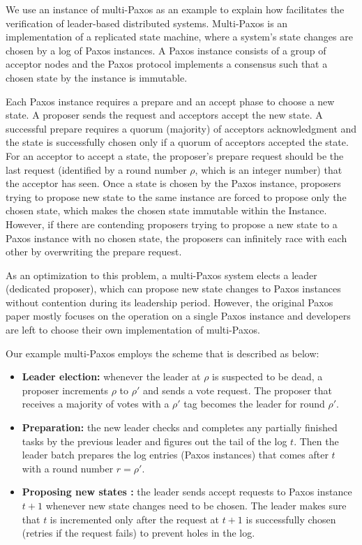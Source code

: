 We use an instance of multi-Paxos as an example to explain how \sysname{} 
facilitates the verification of leader-based distributed systems.
Multi-Paxos is an implementation of a
replicated state machine, where a system's state changes are chosen by a 
log of Paxos instances. A Paxos instance consists of a group of acceptor nodes
and the Paxos protocol implements a consensus such that a chosen state by the
instance is immutable.

Each Paxos instance requires a prepare and an accept phase to choose a new
state. A proposer sends the request and acceptors accept the new state. 
A successful prepare requires a quorum (majority) of acceptors acknowledgment
and the state is successfully chosen only if a quorum of acceptors 
accepted the state. For an acceptor to accept a state, the proposer's prepare
request should be the last request (identified by a round number $\rho$, which is an integer number)
that the
acceptor has seen. Once a state is chosen by the Paxos instance,
proposers trying to propose new state to the same instance are forced to propose
only the chosen state, which makes the chosen state immutable within the
Instance.  However, if there are contending proposers trying to propose a new
state to a Paxos instance with no chosen state, the proposers can infinitely
race with each other by overwriting the prepare request.

As an optimization to this problem, a multi-Paxos system elects a
leader (dedicated proposer), which can propose new state changes to Paxos
instances without contention during its leadership period. However, the
original Paxos paper mostly focuses on the operation on a single Paxos instance
and developers are left to choose their own implementation of multi-Paxos.

Our example multi-Paxos employs the scheme that is described as below: 
\begin{itemize}[leftmargin=*]
	\item {\textbf{Leader election: }} whenever the leader at $\rho$ is
		suspected to be dead, a proposer increments $\rho$ to $\rho'$ and 
		sends a vote request. The proposer that receives a majority 
		of votes with a $\rho'$ tag becomes the leader for round $\rho'$.
	\item {\textbf{Preparation: }} the new leader checks and completes any
		partially finished tasks by the previous leader and figures out the
		tail of the log $t$. Then the leader batch prepares the log entries
		(Paxos instances) that comes after $t$ with a round number
		$r = \rho'$.
	\item {\textbf{Proposing new states :}} the leader sends accept requests
		to Paxos instance $t+1$ whenever new state changes need to be chosen.
		The leader makes sure that $t$ is incremented only after the
		request at $t+1$ is successfully chosen (retries if the 
		request fails) to prevent holes in the log.
\end{itemize}


